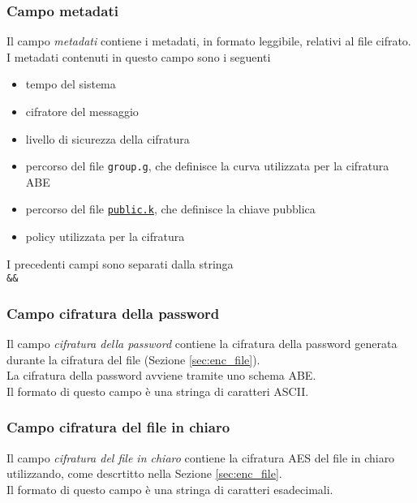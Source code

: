 \documentclass[a4paper,twoside,10pt,openany]{scrbook}
\begin{document}
\subsubsection{Campo metadati}\label{sec:ct_meta}
%
Il campo \emph{metadati} contiene i metadati, in formato leggibile, relativi al file cifrato. 
I metadati contenuti in questo campo sono i seguenti
\begin{itemize}
 \item tempo del sistema
 \item cifratore del messaggio
 \item livello di sicurezza della cifratura
 \item percorso del file \texttt{group.g}, che definisce la curva utilizzata per la cifratura ABE
 \item percorso del file \texttt{\hyperref[sec:format_pk]{public.k}}, che definisce la chiave pubblica
 \item policy utilizzata per la cifratura
\end{itemize}
I precedenti campi sono separati dalla stringa\\
\texttt{\&\&}
%
\subsubsection{Campo cifratura della password}\label{sec:ct_abeenc}
%
Il campo \emph{cifratura della password} contiene la cifratura della password generata durante la cifratura del file (Sezione \ref{sec:enc_file}). \\
La cifratura della password avviene tramite uno schema ABE.\\
Il formato di questo campo è una stringa di caratteri ASCII.
%
\subsubsection{Campo cifratura del file in chiaro}\label{sec:ct_symenc}
%
Il campo \emph{cifratura del file in chiaro} contiene la cifratura AES del file in chiaro utilizzando, come descrtitto nella Sezione \ref{sec:enc_file}.\\
Il formato di questo campo è una stringa di caratteri esadecimali.
%
\end{document}
